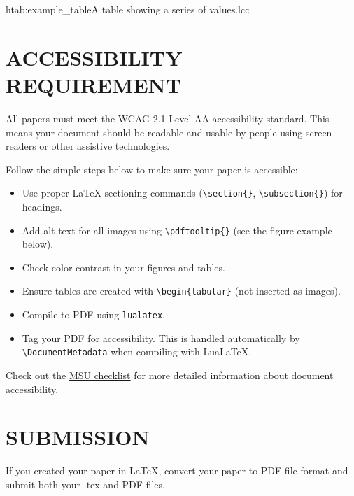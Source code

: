 \documentclass{issw}
\begin{document}
\begin{taggedtable}{h}{tab:example_table}{A table showing a series of values.}{lcc}
\end{taggedtable}

\section{ACCESSIBILITY REQUIREMENT}
All papers must meet the WCAG 2.1 Level AA accessibility standard. This means your document should be readable and usable by people using screen readers or other assistive technologies.

Follow the simple steps below to make sure your paper is accessible:  
\begin{itemize}
 \item Use proper LaTeX sectioning commands (\verb|\section{}|, \verb|\subsection{}|) for headings.
 \item Add alt text for all images using \verb|\pdftooltip{}| (see the figure example below).
 \item Check color contrast in your figures and tables.
 \item Ensure tables are created with \verb|\begin{tabular}| (not inserted as images).
 \item Compile to PDF using \verb|lualatex|.
 \item Tag your PDF for accessibility. This is handled automatically by \verb|\DocumentMetadata| when compiling with LuaLaTeX.
\end{itemize}
Check out the \href{https://guides.lib.montana.edu/accessibility/checklist}{MSU checklist} for more detailed information about document accessibility.

\section{SUBMISSION}
If you created your paper in LaTeX, convert your paper to PDF file format and submit both your .tex and PDF files.
\end{document}
